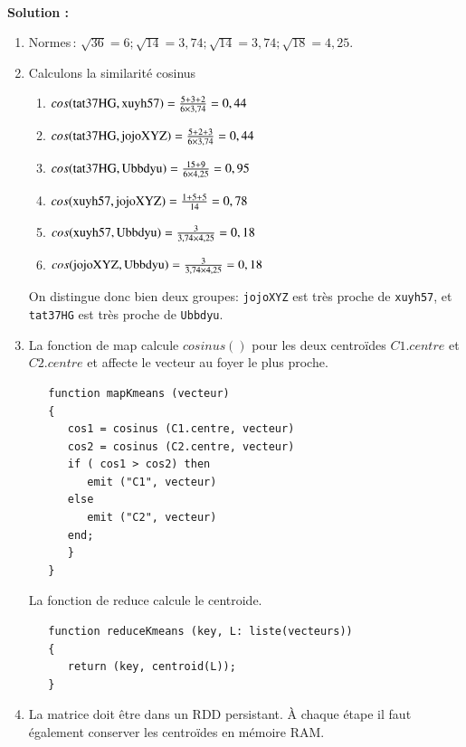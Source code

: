 \documentclass[11pt,a4paper]{article}
\newenvironment{solution}[0]{
~\\ \color{red} \textbf{Solution : }\color{black}}{%
}
\begin{document}
\begin{solution}
\begin{enumerate}
\item Normes\,: $\sqrt{36}=6 ; \sqrt{14}=3,74 ; \sqrt{14}=3,74; \sqrt{18}=4,25$.

\item Calculons la similarité cosinus

    \begin{enumerate}
       \item $cos(\rm{tat37HG, xuyh57}) =\frac{5+3+2}{6 \times 3,74} = 0,44$
       \item $cos(\rm{tat37HG, jojoXYZ}) =\frac{5+2+3}{6 \times 3,74} = 0,44$
       \item $cos(\rm{tat37HG, Ubbdyu}) =\frac{15+9}{6 \times 4,25}=0,95$
       \item $cos(\rm{xuyh57, jojoXYZ}) =\frac{1+5+5}{14}=0,78$
       \item $cos(\rm{xuyh57, Ubbdyu}) =\frac{3}{3,74 \times 4,25}=0,18$
       \item $cos(\rm{jojoXYZ, Ubbdyu}) =\frac{3}{3,74 \times 4,25}=0,18$
    \end{enumerate}
    
    On distingue donc bien deux groupes: \texttt{jojoXYZ} est très proche 
    de \texttt{xuyh57}, et \texttt{tat37HG} est très proche 
    de \texttt{Ubbdyu}.
    
    \item La fonction de map calcule $cosinus()$ pour les deux centroïdes
    $C1.centre$ et  $C2.centre$ et affecte le vecteur au foyer le plus proche.
    
    \begin{small}
\begin{verbatim}
   function mapKmeans (vecteur)
   {
      cos1 = cosinus (C1.centre, vecteur)
      cos2 = cosinus (C2.centre, vecteur)
      if ( cos1 > cos2) then
         emit ("C1", vecteur)
      else
         emit ("C2", vecteur)
      end;
      }
   }
\end{verbatim}
\end{small}
    
    La fonction de reduce calcule le centroide.
        \begin{small}
\begin{verbatim}
   function reduceKmeans (key, L: liste(vecteurs))
   {
      return (key, centroid(L));
   }
\end{verbatim}
\end{small}
    
    \item La matrice doit être dans un RDD persistant. À chaque étape il  
    faut également conserver les centroïdes en mémoire RAM.
    
 \end{enumerate}
\end{solution}
\end{document}
